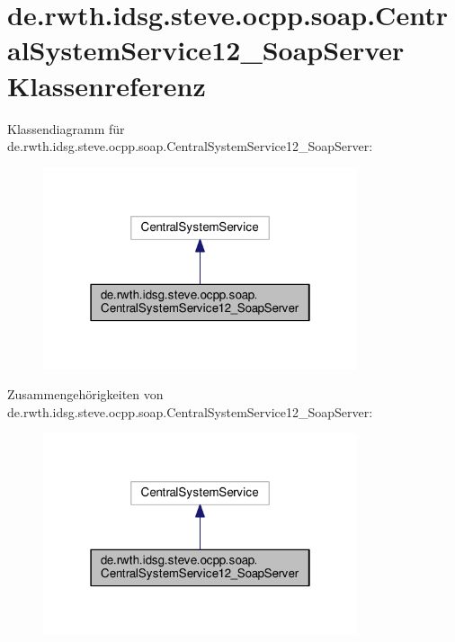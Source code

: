 \hypertarget{classde_1_1rwth_1_1idsg_1_1steve_1_1ocpp_1_1soap_1_1_central_system_service12___soap_server}{\section{de.\-rwth.\-idsg.\-steve.\-ocpp.\-soap.\-Central\-System\-Service12\-\_\-\-Soap\-Server Klassenreferenz}
\label{classde_1_1rwth_1_1idsg_1_1steve_1_1ocpp_1_1soap_1_1_central_system_service12___soap_server}
}


Klassendiagramm für de.\-rwth.\-idsg.\-steve.\-ocpp.\-soap.\-Central\-System\-Service12\-\_\-\-Soap\-Server\-:\nopagebreak
\begin{figure}[H]
\begin{center}
\leavevmode
\includegraphics[width=262pt]{classde_1_1rwth_1_1idsg_1_1steve_1_1ocpp_1_1soap_1_1_central_system_service12___soap_server__inherit__graph}
\end{center}
\end{figure}


Zusammengehörigkeiten von de.\-rwth.\-idsg.\-steve.\-ocpp.\-soap.\-Central\-System\-Service12\-\_\-\-Soap\-Server\-:\nopagebreak
\begin{figure}[H]
\begin{center}
\leavevmode
\includegraphics[width=262pt]{classde_1_1rwth_1_1idsg_1_1steve_1_1ocpp_1_1soap_1_1_central_system_service12___soap_server__coll__graph}
\end{center}
\end{figure}

